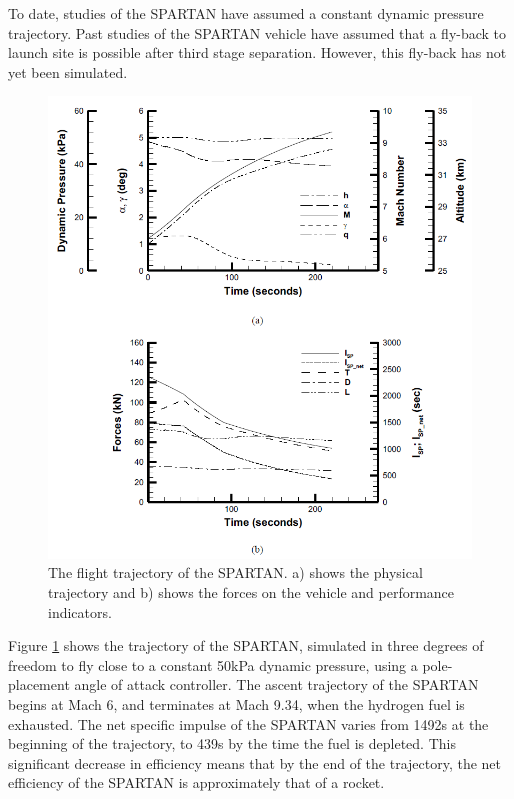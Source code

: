 To date, studies of the SPARTAN have assumed a constant dynamic pressure trajectory\cite{Preller2017b}.
Past studies of the SPARTAN vehicle have assumed that a fly-back to launch site is possible after third stage separation\cite{Preller2017b}. However, this fly-back has not yet been simulated. 


	
\begin{figure}[ht]
\centering
\includegraphics[width=0.9\linewidth]{figures/2_literature-review/SPARTAN_traj1}
\caption{The flight trajectory of the SPARTAN. a) shows the physical trajectory and b) shows the forces on the vehicle and performance indicators.}
\label{fig:SPARTAN_traj}
\end{figure}
Figure \ref{fig:SPARTAN_traj} shows the trajectory of the SPARTAN, simulated in three degrees of freedom to fly close to a constant 50kPa dynamic pressure, using a pole-placement angle of attack controller\cite{Preller2017b}.
The ascent trajectory of the SPARTAN begins at Mach 6, and terminates at Mach 9.34, when the hydrogen fuel is exhausted\cite{Preller2017b}. 
The net specific impulse of the SPARTAN varies from 1492s at the beginning of the trajectory, to 439s by the time the fuel is depleted\cite{Preller2017b}. This significant decrease in efficiency means that by the end of the trajectory, the net efficiency of the SPARTAN is approximately that of a rocket\cite{Preller2017b}.

